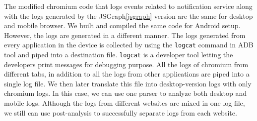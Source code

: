 \textbf{}
The modified chromium code that logs events related to notification service along with the logs generated by the JSGraph\ref{jsgraph} version are the same for desktop and mobile browser. We built and compiled the same code for Android setup. However, the logs are generated in a different manner. The logs generated from every application in the device is collected by using the \texttt{logcat} command in ADB tool and piped into a destination file. \texttt{logcat} is a developer tool letting the developers print messages for debugging purpose. All the logs of chromium from different tabs, in addition to all the logs from other applications are piped into a single log file. We then later translate this file into desktop-version logs with only chromium logs. In this case, we can use one parser to analyze both desktop and mobile logs. Although the logs from different websites are mixed in one log file, we still can use post-analysis to successfully separate logs from each website.




